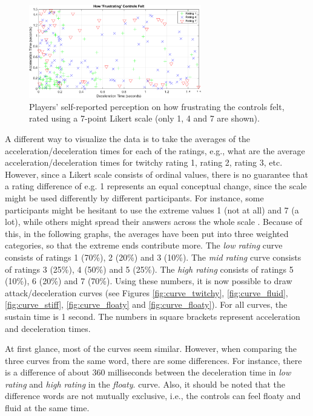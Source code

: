 \begin{figure}[htbp]
\centering
\includegraphics[width=0.67\textwidth]{Pics/Classes/Frustration_classes}
\caption{Players' self-reported perception on how frustrating the controls felt, rated using a 7-point Likert scale (only 1, 4 and 7 are shown).}
\label{fig:frustration}
\end{figure}

A different way to visualize the data is to take the averages of the acceleration/deceleration times for each of the ratings, e.g., what are the average acceleration/deceleration times for twitchy rating 1, rating 2, rating 3, etc. However, since a Likert scale consists of ordinal values, there is no guarantee that a rating difference of e.g. 1 represents an equal conceptual change, since the scale might be used differently by different participants. For instance, some participants might be hesitant to use the extreme values 1 (not at all) and 7 (a lot), while others might spread their answers across the whole scale \cite{cunningham}. Because of this, in the following graphs, the averages have been put into three weighted categories, so that the extreme ends contribute more. The \textit{low rating} curve consists of ratings 1 (70\%), 2 (20\%) and 3 (10\%). The \textit{mid rating} curve consists of ratings 3 (25\%), 4 (50\%) and 5 (25\%). The \textit{high rating} consists of ratings 5 (10\%), 6 (20\%) and 7 (70\%). Using these numbers, it is now possible to draw attack/deceleration curves (see Figures \ref{fig:curve_twitchy}, \ref{fig:curve_fluid}, \ref{fig:curve_stiff}, \ref{fig:curve_floaty} and \ref{fig:curve_floaty}). For all curves, the sustain time is 1 second. The numbers in square brackets represent acceleration and deceleration times.

At first glance, most of the curves seem similar. However, when comparing the three curves from the same word, there are some differences. For instance, there is a difference of about 360 milliseconds between the deceleration time in \textit{low rating} and \textit{high rating} in the \textit{floaty}. curve. Also, it should be noted that the difference words are not mutually exclusive, i.e., the controls can feel floaty and fluid at the same time.

